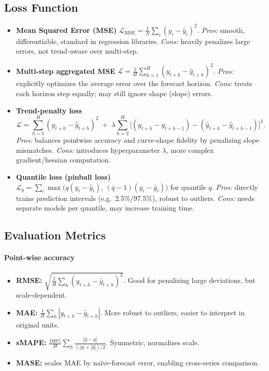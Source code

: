 \documentclass[a4paper,12pt]{report}  %
\begin{document}
\subsection{Loss Function}
\begin{itemize}
  \item \textbf{Mean Squared Error (MSE)}  
        \(\mathcal{L}_{\mathrm{MSE}} = \frac{1}{N}\sum_i (y_i - \hat y_i)^2\).  
        \emph{Pros:} smooth, differentiable, standard in regression libraries.  
        \emph{Cons:} heavily penalizes large errors, not trend‐aware over multi‐step.  
  \item \textbf{Multi-step aggregated MSE}
        \(\displaystyle \mathcal{L} = \frac{1}{H}\sum_{h=1}^H (y_{t+h} - \hat y_{t+h})^2\).  
        \emph{Pros:} explicitly optimizes the average error over the forecast horizon.  
        \emph{Cons:} treats each horizon step equally; may still ignore shape (slope) errors.  
  \item \textbf{Trend‐penalty loss}
        \[
          \mathcal{L} = \sum_{h=1}^H (y_{t+h}-\hat y_{t+h})^2
          \;+\;\lambda\sum_{h=2}^H\bigl[(y_{t+h}-y_{t+h-1}) - (\hat y_{t+h}-\hat y_{t+h-1})\bigr]^2.
        \]
        \emph{Pros:} balances pointwise accuracy and curve‐shape fidelity by penalizing slope mismatches.  
        \emph{Cons:} introduces hyperparameter \(\lambda\), more complex gradient/hessian computation.  
  \item \textbf{Quantile loss (pinball loss)}  
        \(\mathcal{L}_q = \sum_i\max\bigl(q(y_i - \hat y_i),\,(q-1)(y_i - \hat y_i)\bigr)\) for quantile \(q\).  
        \emph{Pros:} directly trains prediction intervals (e.g.\ 2.5\%/97.5\%), robust to outliers.  
        \emph{Cons:} needs separate models per quantile, may increase training time.  
\end{itemize}

\subsection{Evaluation Metrics}
\paragraph{Point-wise accuracy}
\begin{itemize}
  \item \textbf{RMSE:} \(\sqrt{\tfrac{1}{H}\sum_h (y_{t+h} - \hat y_{t+h})^2}\). Good for penalizing large deviations, but scale‐dependent.
  \item \textbf{MAE:} \(\tfrac{1}{H}\sum_h |y_{t+h} - \hat y_{t+h}|\). More robust to outliers, easier to interpret in original units.
  \item \textbf{sMAPE:} \(\tfrac{100\%}{H}\sum_h\frac{|\hat y - y|}{(|y|+|\hat y|)/2}\). Symmetric, normalizes scale.
  \item \textbf{MASE:} scales MAE by naïve‐forecast error, enabling cross‐series comparison.
\end{itemize}
\end{document}

